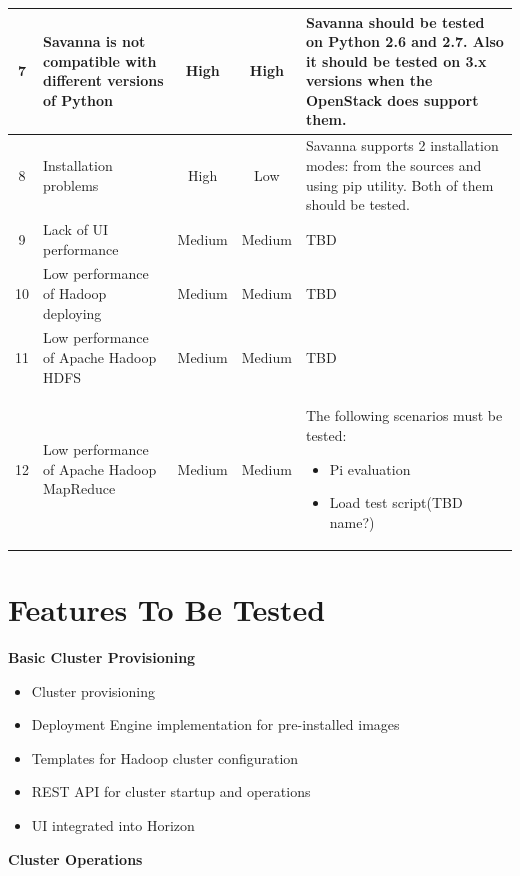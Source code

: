\documentclass[a4paper,11pt]{article}
\begin{document}
\begin{longtable}{|c|p{3cm}|c|c|p{8cm}|}
7&Savanna is not compatible with different versions of Python& High & High & Savanna should be tested on Python 2.6 and 2.7. Also it should be tested on 3.x versions when the OpenStack does support them. \\ \hline
8&Installation problems& High &  Low & Savanna supports 2 installation modes: from the sources and using pip utility. Both of them should be tested.\\ \hline
9&Lack of UI performance & Medium & Medium & TBD \\ \hline
10&Low performance of Hadoop deploying & Medium & Medium & TBD\\ \hline
11&Low performance of Apache Hadoop HDFS & Medium & Medium & TBD\\ \hline
12&Low performance of Apache Hadoop MapReduce & Medium & Medium & The following scenarios must be tested:
\begin{itemize}
\item Pi evaluation
\item Load test script(TBD name?)
\end{itemize}
\\ \hline
\end{longtable}





\section{Features To Be Tested}
\textbf{Basic Cluster Provisioning}

\begin{itemize}
    \item Cluster provisioning
    \item Deployment Engine implementation for pre-installed images
    \item Templates for Hadoop cluster configuration
    \item REST API for cluster startup and operations
    \item UI integrated into Horizon
\end{itemize}
\textbf{Cluster Operations}
\end{document}
